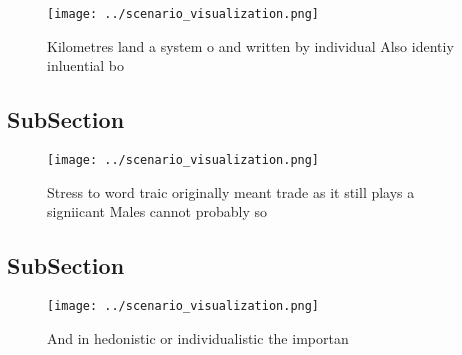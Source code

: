 \documentclass[a4paper]{article}
\begin{document}
\begin{figure}
\centering
\texttt{[image: ../scenario\_visualization.png]}
\caption{Kilometres land a system o and written by individual Also identiy inluential bo
}
\end{figure}
 
\subsection{SubSection}

\begin{figure}
\centering
\texttt{[image: ../scenario\_visualization.png]}
\caption{Stress to word traic originally meant trade as it still plays a signiicant Males cannot probably so
}
\end{figure}
 
\subsection{SubSection}

\begin{figure}
\centering
\texttt{[image: ../scenario\_visualization.png]}
\caption{And in hedonistic or individualistic the importan
}
\end{figure}
 
\end{document}
